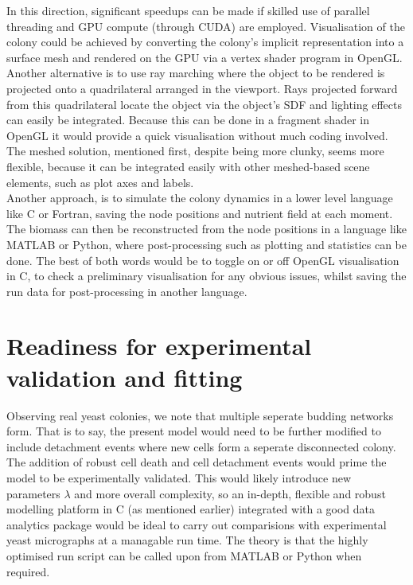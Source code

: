 In this direction, significant speedups can be made if skilled use of 
parallel threading and GPU compute (through CUDA) are employed. Visualisation 
of the colony could be achieved by converting the colony's
implicit representation into a surface mesh and rendered on the GPU
via a vertex shader program in OpenGL. Another alternative 
is to use ray marching where the object to be rendered is projected 
onto a quadrilateral arranged in the viewport. Rays
projected forward from this quadrilateral locate the object via 
the object's SDF and lighting effects can easily be integrated. Because 
this can be done in a fragment shader in OpenGL it 
would provide a quick visualisation without much 
coding involved. The meshed solution, mentioned first,
despite being more clunky, seems more flexible,
because it can be integrated easily with other meshed-based
scene elements, such as plot axes and labels.
\\

Another approach, is to simulate the colony dynamics in a lower 
level language like C or Fortran, saving the node positions and nutrient 
field at each moment. The biomass can then be reconstructed
from the node positions in a language like MATLAB or Python,
where post-processing such as plotting and statistics can be done.
The best of both words would be to toggle on or off 
OpenGL visualisation in C, to check a
preliminary visualisation for any obvious issues, whilst saving 
the run data for post-processing in another language.





\section{Readiness for experimental validation and fitting}\label{expFitting}
Observing real yeast colonies, we note that multiple
seperate budding networks form. That is to say,
the present model would need to be further modified 
to include detachment events where new cells form a 
seperate disconnected colony.
\\

The addition of robust cell death and cell detachment events would 
prime the model to be experimentally validated. This 
would likely introduce new parameters $\lambda$ and more 
overall complexity, so an in-depth, flexible and robust modelling platform 
in C (as mentioned earlier) integrated with a good data analytics package 
would be ideal to carry out comparisions with experimental yeast micrographs
at a managable run time. The theory is that the highly optimised run 
script can be called upon from MATLAB or Python when required.
\\

